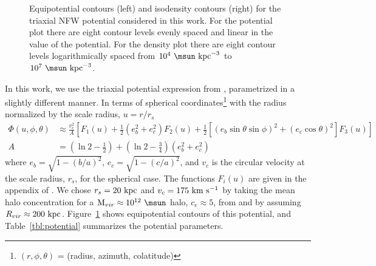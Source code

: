 \begin{figure}[h]
\centering
\caption{Equipotential contours (left) and isodensity contours (right) for the
triaxial NFW potential considered in this work. For the potential plot there are
eight contour levels evenly spaced and linear in the value of the potential. For
the density plot there are eight contour levels logarithmically spaced from
$10^4~\msun~{\rm kpc}^{-3}$ to $10^7~\msun~{\rm kpc}^{-3}$.}
\label{fig:potential}
\end{figure}

In this work, we use the triaxial potential expression from \citet{leesuto03},
parametrized in a slightly different manner. In terms of spherical
coordinates\footnote{$(r,\phi,\theta)$ = (radius, azimuth, colatitude)} with the
radius normalized by the scale radius, $u = r/r_s$
\begin{align}
	\Phi(u,\phi,\theta) &\approx \frac{v_c^2}{A}\left[F_1(u) + \frac{1}{2}(e_b^2 + e_c^2)F_2(u) + \frac{1}{2} [(e_b\sin\theta \sin\phi)^2 + (e_c\cos\theta)^2] F_3(u) \right]\label{eq:potential}\\
	A &= \left(\ln2 - \frac{1}{2}\right) + \left(\ln2-\frac{3}{4}\right) (e_b^2 + e_c^2)
\end{align}
where $e_b = \sqrt{1 - (b/a)^2}$, $e_c = \sqrt{1 - (c/a)^2}$, and $v_c$ is the
circular velocity at the scale radius, $r_s$, for the spherical case. The
functions $F_i(u)$ are given in the appendix of \cite{leesuto03}. We chose
$r_s=20~{\rm kpc}$ and $v_c = 175~{\rm km}~{\rm s}^{-1}$ by taking the mean halo
concentration for a ${\rm M}_{vir} \approx 10^{12}~\msun$ halo, $c_e\approx5$,
from \cite{jing02} and by assuming $R_{vir}\approx200~{\rm kpc}$.
Figure~\ref{fig:potential} shows equipotential contours of this potential, and
Table~\ref{tbl:potential} summarizes the potential parameters.

